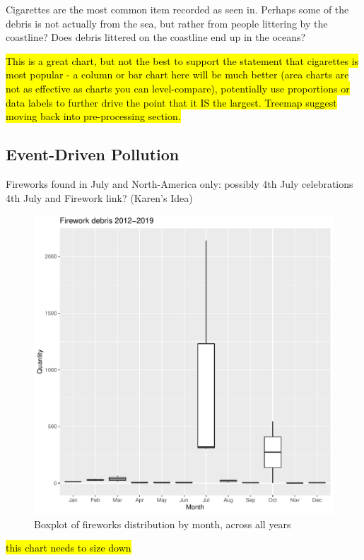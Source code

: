 \documentclass[10pt]{article}\usepackage[]{graphicx}\usepackage[]{color}
\makeatletter
\def\maxwidth{ %
  \ifdim\Gin@nat@width>\linewidth
    \linewidth
  \else
    \Gin@nat@width
  \fi
}
\newenvironment{knitrout}{}{} %
\makeatother
\begin{document}
Cigarettes are the most common item recorded as seen in. %
Perhaps some of the debris is not actually from the sea, but rather from people littering by the coastline? Does debris littered on the coastline end up in the oceans?

\hl{This is a great chart, but not the best to support the statement that cigarettes is most popular - a column or bar chart here will be much better (area charts are not as effective as charts you can level-compare), potentially use proportions or data labels to further drive the point that it IS the largest. Treemap suggest moving back into pre-processing section.}



\subsection{Event-Driven Pollution}

Fireworks found in July and North-America only: possibly 4th July celebrations\\
4th July and Firework link? (Karen's Idea)\\

\begin{figure}[H] %
\begin{center}
\begin{knitrout}
\color{fgcolor}
\includegraphics[width=\maxwidth]{figure/unnamed-chunk-13-1} 

\end{knitrout}

\caption {Boxplot of fireworks distribution by month, across all years}
\label{figA}
\end {center}
\end {figure}
\hl{this chart needs to size down}
\end{document}
